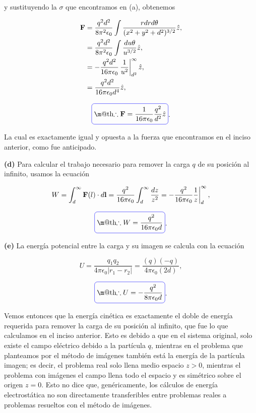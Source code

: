 \documentclass[a4paper,11pt]{article}
\makeatletter
\numberwithin{equation}{section}
\newcommand{\zerodel}{.\kern-\nulldelimiterspace}
\newcommand*{\boxcolor}{blue}
\renewcommand{\boxed}[1]{\textcolor{\boxcolor}{%
\tikz[baseline={([yshift=-1ex]current bounding box.center)}] \node [rectangle, minimum width=1ex,rounded corners,draw] {\normalcolor\m@th$\displaystyle#1$};}}
\makeatother
\begin{document}
y sustituyendo la $\sigma$ que encontramos en (a), obtenemos 

\begin{align*}
 \mathbf{F} &= \frac{q^2d^2}{8\pi^2\epsilon_0}\int 
 \frac{rdrd\theta}{(x^2+y^2+d^2)^{3/2}} \hat{z}, \\
%
  &= \frac{q^2d^2}{8\pi^2\epsilon_0}\int 
 \frac{du\theta}{u^{3/2}}\hat{z}, \\
 &= - \frac{q^2d^2}{16\pi\epsilon_0}\left\zerodel\frac{1}{u^2}\right|_{d^2}^\infty\hat{z}, \\
 &= \frac{q^2d^2}{16\pi\epsilon_0d^4}\hat{z},
\end{align*}

\begin{equation}
 \boxed{\therefore \mathbf{F} = \frac{1}{16\pi\epsilon_0}\frac{q^2}{d^2}\hat{z}}.
\end{equation}

La cual es exactamente igual y opuesta a la fuerza que encontramos en el inciso 
anterior, como fue anticipado.

\vspace{.3cm}

\textbf{(d)} Para calcular el trabajo necesario para remover la carga $q$ de su 
posición al infinito, usamos la ecuación 

\begin{equation}
 W = \int_d^\infty \mathbf{F}(l)\cdot d\mathbf{l} = \frac{q^2}{16\pi\epsilon_0}
 \int_d^\infty \frac{dz}{z^2} = \left\zerodel 
 - \frac{q^2}{16\pi\epsilon_0} \frac{1}{z}\right|_d^\infty,
\end{equation}

\begin{equation}
 \boxed{\therefore W = \frac{q^2}{16\pi\epsilon_0d}}.
\end{equation}

\textbf{(e)} La energía potencial entre la carga y su imagen se calcula 
con la ecuación 

\begin{equation}
 U = \frac{q_1q_2}{4\pi\epsilon_0|r_1 - r_2|} = \frac{(q)(-q)}{4\pi\epsilon_0(2d)},
\end{equation}

\begin{equation}
 \boxed{\therefore U = - \frac{q^2}{8\pi\epsilon_0d}}.
\end{equation}

Vemos entonces que la energía cinética es exactamente el doble de energía requerida 
para remover la carga de su posición al infinito, que fue lo que calculamos en el 
inciso anterior. Esto es debido a que en el sistema original, solo existe el 
campo eléctrico debido a la partícula $q$, mientras en el problema que planteamos 
por el método de imágenes también está la energía de la partícula imagen; es decir, 
el problema real solo llena medio espacio $z>0$, mientras el problema con imágenes 
el campo llena todo el espacio y es simétrico sobre el origen $z=0$. Esto no dice que, 
genéricamente, los cálculos de energía electrostática no son directamente transferibles 
entre problemas reales a problemas resueltos con el método de imágenes.
\end{document}
